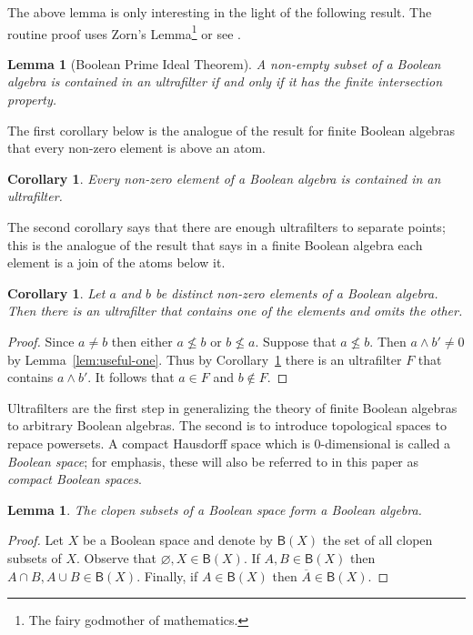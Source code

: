 \documentclass[a4paper]{amsart}
\newtheorem{lemma}[theorem]{Lemma}
\newtheorem{corollary}[theorem]{Corollary}
\begin{document}
The above lemma is only interesting in the light of the following result.
The routine proof uses Zorn's Lemma\footnote{The fairy godmother of mathematics.} or see \cite[Chapter 1, Proposition~2.16]{Koppelberg}.

\begin{lemma}[Boolean Prime Ideal Theorem]\label{lem:BIG}
A non-empty subset of a Boolean algebra is contained in an ultrafilter if and only if it has the finite intersection property.
\end{lemma}

The first corollary below is the analogue of the result for finite Boolean algebras that every non-zero element
is above an atom.

\begin{corollary}\label{cor:latvia} 
Every non-zero element of a Boolean algebra is contained in an ultrafilter.
\end{corollary}

The second corollary says that there are enough ultrafilters to separate points;
this is the analogue of the result that says in a finite Boolean algebra each element is a join of the atoms below it. 

\begin{corollary}\label{cor:germany-two} Let $a$ and $b$ be distinct non-zero elements of a Boolean algebra.
Then there is an ultrafilter that contains one of the elements and omits the other.
\end{corollary}
\begin{proof} Since $a \neq b$ then either $a \nleq b$ or $b \nleq a$.
Suppose that $a \nleq b$.
Then $a \wedge b' \neq 0$ by Lemma~\ref{lem:useful-one}. 
Thus by Corollary~\ref{cor:latvia} there is an ultrafilter $F$ that contains $a \wedge b'$.
It follows that $a \in F$ and $b \notin F$.
\end{proof}

Ultrafilters are the first step in generalizing the theory of finite Boolean algebras to arbitrary Boolean algebras.
The second is to introduce topological spaces to repace powersets.
A compact Hausdorff space which is $0$-dimensional is called a {\em Boolean space};
for emphasis, these will also be referred to in this paper as {\em compact Boolean spaces}.

\begin{lemma}\label{lem:poland} 
The clopen subsets of a Boolean space form a Boolean algebra.
\end{lemma}
\begin{proof} Let $X$ be a Boolean space and denote by $\mathsf{B}(X)$ the set of all clopen subsets of $X$.
Observe that $\varnothing, X \in \mathsf{B}(X)$.
If $A,B \in \mathsf{B}(X)$ then $A \cap B, A \cup B \in \mathsf{B}(X)$. 
Finally, if $A \in \mathsf{B}(X)$ then $\overline{A} \in \mathsf{B}(X)$. 
\end{proof}
\end{document}
